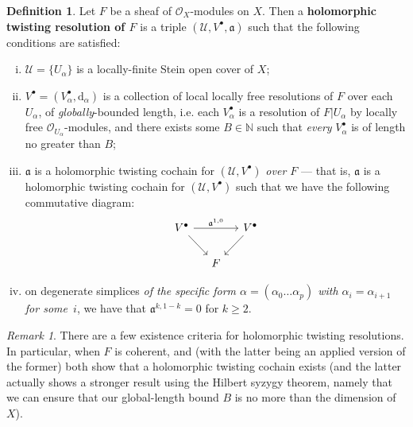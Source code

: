 \documentclass[11pt,fleqn]{article}
\theoremstyle{plain}
\theoremstyle{definition}
\newtheorem{definition}[theorem]{Definition}
\theoremstyle{remark}
\newtheorem{remark}[theorem]{Remark}
\numberwithin{equation}{theorem}
\newcommand{\cover}{\mathcal{U}}
\newcommand{\OO}{\mathcal{O}}
\newcommand{\restricted}{\mathbin{\big\vert}}
\newcommand{\twc}{\mathfrak{a}}
\newcommand{\define}[1]{\textbf{#1}}
\renewcommand{\d}{\mathrm{d}}
\begin{document}
        \begin{definition}\label{definition:holomorphic-twisted-resolution}
            Let $F$ be a sheaf of $\OO_X$-modules on $X$.
            Then a \define{holomorphic twisting resolution of $F$} is a triple $(\cover,V^\bullet,\twc)$ such that the following conditions are satisfied:
            \begin{enumerate}[(i)]
                \item $\cover=\{U_\alpha\}$ is a locally-finite Stein open cover of $X$;
                \item $V^\bullet=(V^\bullet_\alpha,\d_\alpha)$ is a collection of local locally free resolutions of $F$ over each $U_\alpha$, of \emph{globally}-bounded length, i.e. each $V^\bullet_\alpha$ is a resolution of $F\restricted {U_\alpha}$ by locally free $\OO_{U_\alpha}$-modules, and there exists some $B\in\mathbb{N}$ such that \emph{every} $V^\bullet_\alpha$ is of length no greater than $B$;
                \item $\twc$ is a holomorphic twisting cochain for $(\cover,V^\bullet)$ \textit{over $F$} --- that is, $\twc$ is a holomorphic twisting cochain for $(\cover,V^\bullet)$ such that we have the following commutative diagram:
                    \begin{equation*}
                        \begin{tikzcd}[column sep=small]
                            V^\bullet
                                \ar{rr}{\twc^{1,0}}
                                \ar{dr}
                        &&  V^\bullet
                                \ar{dl}
                        \\& F
                        \end{tikzcd}
                    \end{equation*}
                \item on degenerate simplices \emph{of the specific form $\alpha=(\alpha_0\ldots\alpha_p)$ with $\alpha_i=\alpha_{i+1}$ for some~$i$}, we have that $\twc^{k,1-k}=0$ for $k\geqslant2$.
            \end{enumerate}
        \end{definition}

        \begin{remark}
            There are a few existence criteria for holomorphic twisting resolutions.
            In particular, when $F$ is coherent, \cite[Lemma~8.13]{Toledo&Tong1976} and \cite[Lemma~2.4]{Toledo&Tong1978} (with the latter being an applied version of the former) both show that a holomorphic twisting cochain exists (and the latter actually shows a stronger result using the Hilbert syzygy theorem, namely that we can ensure that our global-length bound $B$ is no more than the dimension of $X$).
        \end{remark}
\end{document}
